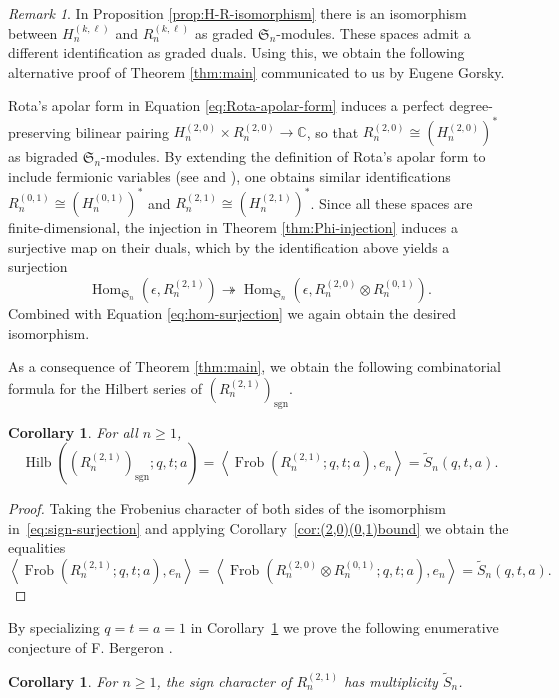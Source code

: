 \documentclass[11pt, noadjust, reqno]{amsart}
\newtheorem{corollary}[theorem]{Corollary}
\theoremstyle{definition}
\theoremstyle{remark}
\newtheorem{remark}[theorem]{Remark}
\numberwithin{equation}{section}
\newcommand{\0}{\emptyset}
\newcommand{\C}{\mathbb{C}}
\renewcommand{\S}{\mathfrak{S}}
\DeclareMathOperator{\Hilb}{Hilb}
\DeclareMathOperator{\Frob}{Frob}
\DeclareMathOperator{\sgn}{sgn}
\DeclareMathOperator{\Hom}{Hom}
\begin{document}
\begin{remark}
 In Proposition \ref{prop:H-R-isomorphism} there is an isomorphism between $H_n^{(k,\ell)}$ and $R_n^{(k,\ell)}$ as graded $\S_n$-modules. 
 These spaces admit a different identification as graded duals.
 Using this, we obtain the following alternative proof of Theorem \ref{thm:main} communicated to us by Eugene Gorsky.
 
 Rota's apolar form in Equation \eqref{eq:Rota-apolar-form} induces a perfect degree-preserving bilinear pairing $H_n^{(2,0)} \times R_n^{(2,0)} \to \C$, so that $R_n^{(2,0)} \cong (H_n^{(2,0)})^*$ as bigraded $\S_n$-modules. By extending the definition of Rota's apolar form to include fermionic variables (see \cite{SwansonWallach1} and \cite[Appendix A]{JiangLentfer}), one obtains similar identifications $R_n^{(0,1)} \cong (H_n^{(0,1)})^*$ and $R_n^{(2,1)} \cong (H_n^{(2,1)})^*$. 
Since all these spaces are finite-dimensional, the injection in Theorem \ref{thm:Phi-injection} induces a surjective map on their duals, which by the identification above yields a surjection
\[
\Hom_{\S_n}\left(\epsilon, R_n^{(2,1)}\right)
\twoheadrightarrow
\Hom_{\mathfrak{S}_n}\left(\epsilon, R_n^{(2,0)} \otimes R_n^{(0,1)}\right).
\]
Combined with Equation \eqref{eq:hom-surjection} we again obtain the desired isomorphism.
\end{remark}

As a consequence of Theorem \ref{thm:main}, we obtain the following combinatorial formula for the Hilbert series of $(R_n^{(2,1)})_{\sgn}$.

\begin{corollary}\label{cor:sign-character-schroder}
    For all $n\geq 1$,
\begin{equation*}
    \Hilb((R_n^{(2,1)})_{\sgn}; q,t;a) = \left\langle \Frob(R_n^{(2,1)}; q,t;a), e_n\right\rangle =  \widetilde{S}_n(q,t,a).
\end{equation*}
\end{corollary}

\begin{proof}
    Taking the Frobenius character of both sides of the isomorphism in~\eqref{eq:sign-surjection} and applying Corollary~\ref{cor:(2,0)(0,1)bound} we obtain the equalities
\[
    \left\langle \Frob(R_n^{(2,1)}; q,t;a), e_n\right\rangle
    = \left\langle \Frob(R_n^{(2,0)} \otimes R_n^{(0,1)}; q,t;a), e_n\right\rangle
    = \widetilde{S}_n(q,t,a).
    \]
\end{proof}


By specializing $q=t=a=1$ in Corollary~\ref{cor:sign-character-schroder} we prove the following enumerative conjecture of F. Bergeron \cite[Table 3]{Bergeron2020}.
\begin{corollary}\label{cor:Bergeron-conj}
    For $n \geq 1$, the sign character of $R_n^{(2,1)}$ has multiplicity $\widetilde{S}_n$.
\end{corollary}
\end{document}
